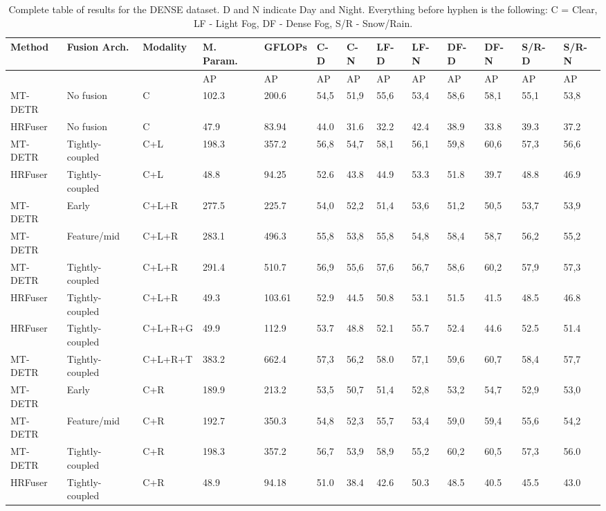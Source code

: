 \documentclass[report.tex]{subfiles}
\begin{document}
    \begin{sidewaystable}
        \centering
        \caption{Complete table of results for the DENSE dataset. D and N indicate Day and Night. Everything before hyphen is the following: C = Clear, LF - Light Fog, DF - Dense Fog, S/R - Snow/Rain.}
        \label{tab:complete_results_table}
        \begin{tabular}{@{}lllllllllllll@{}}
        \toprule
        Method    & Fusion Arch.   & Modality & M. Param. & GFLOPs & C-D & C-N & LF-D & LF-N & DF-D & DF-N & S/R-D & S/R-N \\ \midrule
                  &                &          & AP        & AP     & AP  & AP  & AP   & AP   & AP   & AP   & AP    & AP    \\
        MT-DETR   & No fusion      & C        & 102.3     & 200.6  & 54,5 & 51,9 & 55,6 & 53,4 & 58,6 & 58,1 & 55,1  & 53,8  \\
        HRFuser   & No fusion      & C        & 47.9      & 83.94  & 44.0 & 31.6 & 32.2 & 42.4 & 38.9 & 33.8 & 39.3  & 37.2  \\
        MT-DETR   & Tightly-coupled & C+L      & 198.3     & 357.2  & 56,8 & 54,7 & 58,1 & 56,1 & 59,8 & 60,6 & 57,3  & 56,6  \\
        HRFuser   & Tightly-coupled & C+L      & 48.8      & 94.25  & 52.6 & 43.8 & 44.9 & 53.3 & 51.8 & 39.7 & 48.8  & 46.9  \\
        MT-DETR   & Early          & C+L+R    & 277.5     & 225.7  & 54,0 & 52,2 & 51,4 & 53,6 & 51,2 & 50,5 & 53,7  & 53,9  \\
        MT-DETR   & Feature/mid    & C+L+R    & 283.1     & 496.3  & 55,8 & 53,8 & 55,8 & 54,8 & 58,4 & 58,7 & 56,2  & 55,2  \\
        MT-DETR   & Tightly-coupled & C+L+R    & 291.4     & 510.7  & 56,9 & 55,6 & 57,6 & 56,7 & 58,6 & 60,2 & 57,9  & 57,3  \\
        HRFuser   & Tightly-coupled & C+L+R    & 49.3      & 103.61 & 52.9 & 44.5 & 50.8 & 53.1 & 51.5 & 41.5 & 48.5  & 46.8  \\
        HRFuser   & Tightly-coupled & C+L+R+G  & 49.9      & 112.9  & 53.7 & 48.8 & 52.1 & 55.7 & 52.4 & 44.6 & 52.5  & 51.4  \\
        MT-DETR   & Tightly-coupled & C+L+R+T  & 383.2     & 662.4  & 57,3 & 56,2 & 58.0 & 57,1 & 59,6 & 60,7 & 58,4  & 57,7  \\
        MT-DETR   & Early          & C+R      & 189.9     & 213.2  & 53,5 & 50,7 & 51,4 & 52,8 & 53,2 & 54,7 & 52,9  & 53,0  \\
        MT-DETR   & Feature/mid    & C+R      & 192.7     & 350.3  & 54,8 & 52,3 & 55,7 & 53,4 & 59,0 & 59,4 & 55,6  & 54,2  \\
        MT-DETR   & Tightly-coupled & C+R      & 198.3     & 357.2  & 56,7 & 53,9 & 58,9 & 55,2 & 60,2 & 60,5 & 57,3  & 56.0  \\
        HRFuser   & Tightly-coupled & C+R      & 48.9      & 94.18  & 51.0 & 38.4 & 42.6 & 50.3 & 48.5 & 40.5 & 45.5  & 43.0  \\ \bottomrule
        \end{tabular}
        \end{sidewaystable}


    
\end{document}
